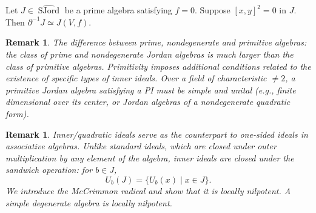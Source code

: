 \documentclass{article}
\newtheorem{remark}[theorem]{Remark}
\begin{document}
\begin{theorem}
Let $J \in \widehat{\operatorname{SJord}}$ be a prime algebra satisfying $f=0$. Suppose $[x,y]^{2}=0$ in $J$. Then $\partial^{-1}J \simeq J(V,f)$.
\end{theorem}

\begin{remark}
The difference between prime, nondegenerate and primitive algebras: the class of prime and nondegenerate Jordan algebras is much larger than the class of primitive algebras. Primitivity imposes additional conditions related to the existence of specific types of inner ideals. Over a field of characteristic $\neq 2$, a primitive Jordan algebra satisfying a PI must be simple and unital (e.g., finite dimensional over its center, or Jordan algebras of a nondegenerate quadratic form).
\end{remark}

\begin{remark}
Inner/quadratic ideals serve as the counterpart to one-sided ideals in associative algebras. Unlike standard ideals, which are closed under outer multiplication by any element of the algebra, inner ideals are closed under the sandwich operation: for $b \in J$,
\[
U_{b}(J)=\{U_{b}(x) \mid x \in J\}.
\]
We introduce the McCrimmon radical and show that it is locally nilpotent. A simple degenerate algebra is locally nilpotent.
\end{remark}
\end{document}
